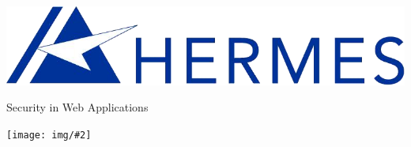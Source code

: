 \documentclass[a4paper,11pt]{article}
\newcommand{\includeimage}[2][scale=1.0]{
	\begin{center}
	\texttt{[image: img/\#2]}
	\end{center}
}
\def\doctitle{Security in Web Applications}
\begin{document}
\begin{titlepage}
\begin{flushright}
\includegraphics[width=0.35\linewidth]{img/hermes}
\end{flushright}
\vspace*{\fill}
\begin{center}
{\Huge\doctitle}
\end{center}
\vspace*{\fill}
\end{titlepage}

\includeimage[width=\linewidth]{by-nc-nd_plain}
\clearpage

\setcounter{tocdepth}{2}
\tableofcontents



\end{document}
